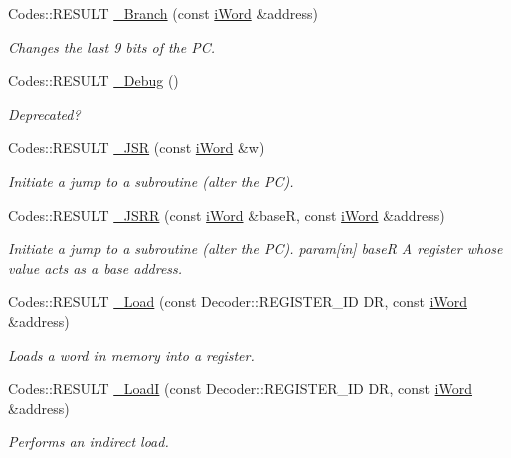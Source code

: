 \begin{DoxyCompactItemize}
Codes::RESULT \hyperlink{classWi11_a09edab9ea53d62c93d5d42bfaa77adf5}{\_\-Branch} (const \hyperlink{classiWord}{iWord} \&address)
\begin{DoxyCompactList}\small\item\em Changes the last 9 bits of the PC. \item\end{DoxyCompactList}\item 
Codes::RESULT \hyperlink{classWi11_a08581ef7b0fa3939185ffa516c905d65}{\_\-Debug} ()
\begin{DoxyCompactList}\small\item\em Deprecated? \item\end{DoxyCompactList}\item 
Codes::RESULT \hyperlink{classWi11_a84b28efa218ee676a4482e38069f5f8b}{\_\-JSR} (const \hyperlink{classiWord}{iWord} \&w)
\begin{DoxyCompactList}\small\item\em Initiate a jump to a subroutine (alter the PC). \item\end{DoxyCompactList}\item 
Codes::RESULT \hyperlink{classWi11_a884c75a5dbe753bc316fb2a8faa30e56}{\_\-JSRR} (const \hyperlink{classiWord}{iWord} \&baseR, const \hyperlink{classiWord}{iWord} \&address)
\begin{DoxyCompactList}\small\item\em Initiate a jump to a subroutine (alter the PC). param\mbox{[}in\mbox{]} baseR A register whose value acts as a base address. \item\end{DoxyCompactList}\item 
Codes::RESULT \hyperlink{classWi11_a521c4d4d670b8bb1e1e7e9226ec2f259}{\_\-Load} (const Decoder::REGISTER\_\-ID DR, const \hyperlink{classiWord}{iWord} \&address)
\begin{DoxyCompactList}\small\item\em Loads a word in memory into a register. \item\end{DoxyCompactList}\item 
Codes::RESULT \hyperlink{classWi11_a76e05be82843d69572d1b3c9a84f4eb0}{\_\-LoadI} (const Decoder::REGISTER\_\-ID DR, const \hyperlink{classiWord}{iWord} \&address)
\begin{DoxyCompactList}\small\item\em Performs an indirect load. \item\end{DoxyCompactList}\item 

\end{DoxyCompactItemize}
